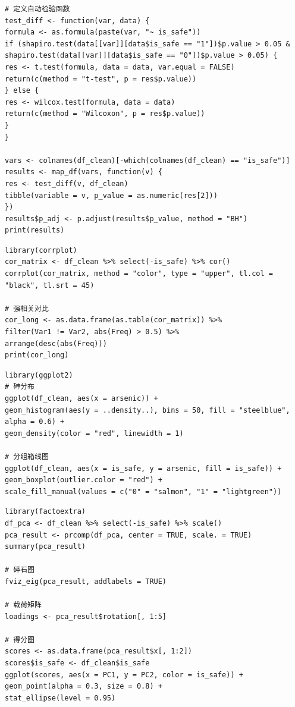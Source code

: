 \documentclass[12pt,a4paper]{ctexart}
\begin{document}
\begin{lstlisting}[caption={03\_hypothesis\_testing.R}]
# 定义自动检验函数
test_diff <- function(var, data) {
formula <- as.formula(paste(var, "~ is_safe"))
if (shapiro.test(data[[var]][data$is_safe == "1"])$p.value > 0.05 &
shapiro.test(data[[var]][data$is_safe == "0"])$p.value > 0.05) {
res <- t.test(formula, data = data, var.equal = FALSE)
return(c(method = "t-test", p = res$p.value))
} else {
res <- wilcox.test(formula, data = data)
return(c(method = "Wilcoxon", p = res$p.value))
}
}

vars <- colnames(df_clean)[-which(colnames(df_clean) == "is_safe")]
results <- map_df(vars, function(v) {
res <- test_diff(v, df_clean)
tibble(variable = v, p_value = as.numeric(res[2]))
})
results$p_adj <- p.adjust(results$p_value, method = "BH")
print(results)
\end{lstlisting}

\begin{lstlisting}[caption={04\_correlation\_analysis.R}]
library(corrplot)
cor_matrix <- df_clean %>% select(-is_safe) %>% cor()
corrplot(cor_matrix, method = "color", type = "upper", tl.col = "black", tl.srt = 45)

# 强相关对比
cor_long <- as.data.frame(as.table(cor_matrix)) %>%
filter(Var1 != Var2, abs(Freq) > 0.5) %>%
arrange(desc(abs(Freq)))
print(cor_long)
\end{lstlisting}

\begin{lstlisting}[caption={05\_visualization.R}]
library(ggplot2)
# 砷分布
ggplot(df_clean, aes(x = arsenic)) +
geom_histogram(aes(y = ..density..), bins = 50, fill = "steelblue", alpha = 0.6) +
geom_density(color = "red", linewidth = 1)

# 分组箱线图
ggplot(df_clean, aes(x = is_safe, y = arsenic, fill = is_safe)) +
geom_boxplot(outlier.color = "red") +
scale_fill_manual(values = c("0" = "salmon", "1" = "lightgreen"))
\end{lstlisting}

\begin{lstlisting}[caption={06\_pca\_analysis.R}]
library(factoextra)
df_pca <- df_clean %>% select(-is_safe) %>% scale()
pca_result <- prcomp(df_pca, center = TRUE, scale. = TRUE)
summary(pca_result)

# 碎石图
fviz_eig(pca_result, addlabels = TRUE)

# 载荷矩阵
loadings <- pca_result$rotation[, 1:5]

# 得分图
scores <- as.data.frame(pca_result$x[, 1:2])
scores$is_safe <- df_clean$is_safe
ggplot(scores, aes(x = PC1, y = PC2, color = is_safe)) +
geom_point(alpha = 0.3, size = 0.8) +
stat_ellipse(level = 0.95)
\end{lstlisting}
\end{document}

